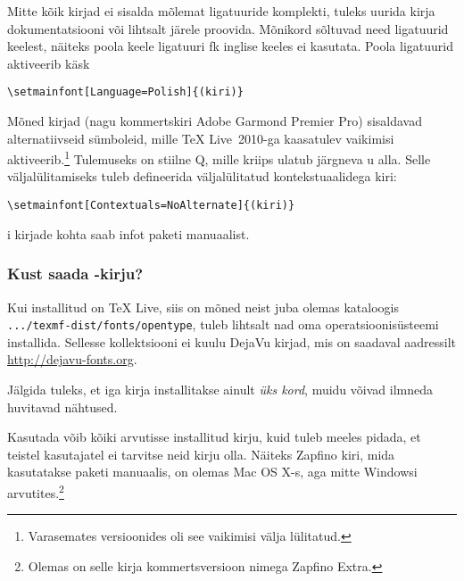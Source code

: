 Mitte kõik kirjad ei sisalda mõlemat ligatuuride komplekti, tuleks uurida
kirja dokumentatsiooni või lihtsalt järele proovida. Mõnikord sõltuvad
need ligatuurid keelest, näiteks poola keele ligatuuri fk inglise keeles
ei kasutata. Poola ligatuurid aktiveerib käsk
\begin{code}
\begin{verbatim}
\setmainfont[Language=Polish]{(kiri)}
\end{verbatim}
\end{code}

Mõned kirjad (nagu kommertskiri Adobe Garmond Premier Pro) sisaldavad alternatiivseid sümboleid,
mille \TeX{} Live~2010-ga kaasatulev
 vaikimisi aktiveerib.\footnote{Varasemates versioonides
oli see vaikimisi välja lülitatud.} Tulemuseks on stiilne Q, mille
kriips ulatub järgneva u alla. Selle väljalülitamiseks tuleb defineerida
väljalülitatud kontekstuaalidega kiri:

\begin{code}
\begin{verbatim}
\setmainfont[Contextuals=NoAlternate]{(kiri)}
\end{verbatim}
\end{code}

i kirjade kohta saab infot paketi 
manuaalist.

\subsubsection{Kust saada -kirju?}

Kui installitud on \TeX{} Live, siis on mõned
neist juba olemas kataloogis \verb|.../texmf-dist/fonts/opentype|, tuleb
lihtsalt nad oma operatsioonisüsteemi installida. Sellesse kollektsiooni
ei kuulu DejaVu kirjad, mis on saadaval
aadressilt \url{http://dejavu-fonts.org}.

Jälgida tuleks, et iga kirja installitakse ainult \emph{üks kord},
muidu võivad ilmneda huvitavad nähtused.

Kasutada võib kõiki arvutisse installitud kirju, kuid tuleb meeles
pidada, et teistel kasutajatel ei tarvitse neid kirju olla. Näiteks
Zapfino kiri, mida kasutatakse paketi 
manuaalis, on olemas Mac OS X-s, aga mitte Windowsi
arvutites.\footnote{Olemas on selle kirja kommertsversioon nimega
Zapfino Extra.}

